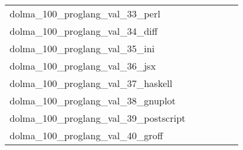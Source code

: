 {\begin{longtable}{m{6cm}m{1.7cm}m{1.7cm}m{1.7cm}m{1.7cm}m{1.7cm}}
	dolma\_100\_proglang\_val\_33\_perl  & \colorbox[HTML]{93d183}{\makebox[\mywidth][c]{2.57}} & \colorbox[HTML]{e0f2a8}{\makebox[\mywidth][c]{2.62}} & \colorbox[HTML]{ffffe5}{\makebox[\mywidth][c]{3.01}} & \colorbox[HTML]{b8e293}{\makebox[\mywidth][c]{2.59}} & \colorbox[HTML]{77c578}{\makebox[\mywidth][c]{2.55}}\\
	dolma\_100\_proglang\_val\_34\_diff  & \colorbox[HTML]{98d485}{\makebox[\mywidth][c]{2.87}} & \colorbox[HTML]{e4f4ab}{\makebox[\mywidth][c]{2.95}} & \colorbox[HTML]{ffffe5}{\makebox[\mywidth][c]{3.43}} & \colorbox[HTML]{afdd8f}{\makebox[\mywidth][c]{2.89}} & \colorbox[HTML]{77c578}{\makebox[\mywidth][c]{2.86}}\\
	dolma\_100\_proglang\_val\_35\_ini  & \colorbox[HTML]{77c578}{\makebox[\mywidth][c]{3.91}} & \colorbox[HTML]{f7fcba}{\makebox[\mywidth][c]{4.16}} & \colorbox[HTML]{ffffe5}{\makebox[\mywidth][c]{4.90}} & \colorbox[HTML]{dcf1a5}{\makebox[\mywidth][c]{4.05}} & \colorbox[HTML]{b3df91}{\makebox[\mywidth][c]{3.98}}\\
	dolma\_100\_proglang\_val\_36\_jsx  & \colorbox[HTML]{d7efa2}{\makebox[\mywidth][c]{1.83}} & \colorbox[HTML]{ddf1a6}{\makebox[\mywidth][c]{1.84}} & \colorbox[HTML]{ffffe5}{\makebox[\mywidth][c]{1.95}} & \colorbox[HTML]{c5e799}{\makebox[\mywidth][c]{1.83}} & \colorbox[HTML]{77c578}{\makebox[\mywidth][c]{1.82}}\\
	dolma\_100\_proglang\_val\_37\_haskell  & \colorbox[HTML]{77c578}{\makebox[\mywidth][c]{2.94}} & \colorbox[HTML]{e3f4aa}{\makebox[\mywidth][c]{3.07}} & \colorbox[HTML]{ffffe5}{\makebox[\mywidth][c]{3.73}} & \colorbox[HTML]{c5e799}{\makebox[\mywidth][c]{3.02}} & \colorbox[HTML]{7fc97b}{\makebox[\mywidth][c]{2.95}}\\
	dolma\_100\_proglang\_val\_38\_gnuplot  & \colorbox[HTML]{77c578}{\makebox[\mywidth][c]{2.65}} & \colorbox[HTML]{fafdcd}{\makebox[\mywidth][c]{2.88}} & \colorbox[HTML]{ffffe5}{\makebox[\mywidth][c]{3.36}} & \colorbox[HTML]{f4fab6}{\makebox[\mywidth][c]{2.81}} & \colorbox[HTML]{e5f5ac}{\makebox[\mywidth][c]{2.77}}\\
	dolma\_100\_proglang\_val\_39\_postscript  & \colorbox[HTML]{fdfedf}{\makebox[\mywidth][c]{19.09}} & \colorbox[HTML]{ffffe5}{\makebox[\mywidth][c]{19.52}} & \colorbox[HTML]{ffffe5}{\makebox[\mywidth][c]{19.56}} & \colorbox[HTML]{8ecf81}{\makebox[\mywidth][c]{18.66}} & \colorbox[HTML]{77c578}{\makebox[\mywidth][c]{18.64}}\\
	dolma\_100\_proglang\_val\_40\_groff  & \colorbox[HTML]{77c578}{\makebox[\mywidth][c]{6.13}} & \colorbox[HTML]{def2a6}{\makebox[\mywidth][c]{6.32}} & \colorbox[HTML]{ffffe5}{\makebox[\mywidth][c]{7.45}} & \colorbox[HTML]{b7e193}{\makebox[\mywidth][c]{6.22}} & \colorbox[HTML]{b0de8f}{\makebox[\mywidth][c]{6.21}}\\

\end{longtable}}
